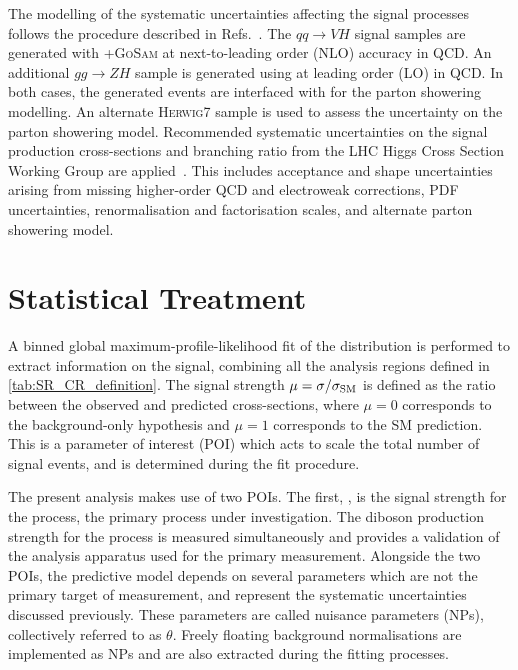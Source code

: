 The modelling of the systematic uncertainties affecting the signal processes follows the procedure described in Refs.~\cite{HIGG-2018-50,deFlorian:2016spz,HIGG-2016-29}.
The $qq \rightarrow VH$ signal samples are generated with \POWHEGBOX[v2]+\textsc{GoSam} at next-to-leading order (NLO) accuracy in QCD. 
An additional $gg \rightarrow ZH$ sample is generated using \POWHEGBOX[v2] at leading order (LO) in QCD.
In both cases, the generated events are interfaced with  for the parton showering modelling.
An alternate \textsc{Herwig7} sample is used to assess the uncertainty on the parton showering model.
Recommended systematic uncertainties on the signal production cross-sections and \Hbb branching ratio from the LHC Higgs Cross Section Working Group are applied~\cite{Dittmaier:2012vm,Heinemeyer:2013tqa}.
This includes acceptance and shape uncertainties arising from missing higher-order QCD and electroweak corrections, PDF uncertainties, renormalisation and factorisation scales, and alternate parton showering model.

\section{Statistical Treatment}\label{sec:vhbb_fit}

A binned global maximum-profile-likelihood fit of the \mJ distribution is performed to extract information on the signal, combining all the analysis regions defined in \cref{tab:SR_CR_definition}.
The signal strength $\mu = \sigma / \sigma_{\textnormal{SM}}$ is defined as the ratio between the observed and predicted cross-sections, where $\mu = 0$ corresponds to the background-only hypothesis and $\mu = 1$ corresponds to the SM prediction.
This is a parameter of interest (POI) which acts to scale the total number of signal events, and is determined during the fit procedure.

The present analysis makes use of two POIs.
The first, \muVH, is the signal strength for the \VHbb process, the primary process under investigation.
The diboson production strength \muVZ for the \VZbb process is measured simultaneously and provides a validation of the analysis apparatus used for the primary \Hbb measurement.
Alongside the two POIs, the predictive model depends on several parameters which are not the primary target of measurement, and represent the systematic uncertainties discussed previously.
These parameters are called nuisance parameters (NPs), collectively referred to as $\theta$.
Freely floating background normalisations are implemented as NPs and are also extracted during the fitting processes.


